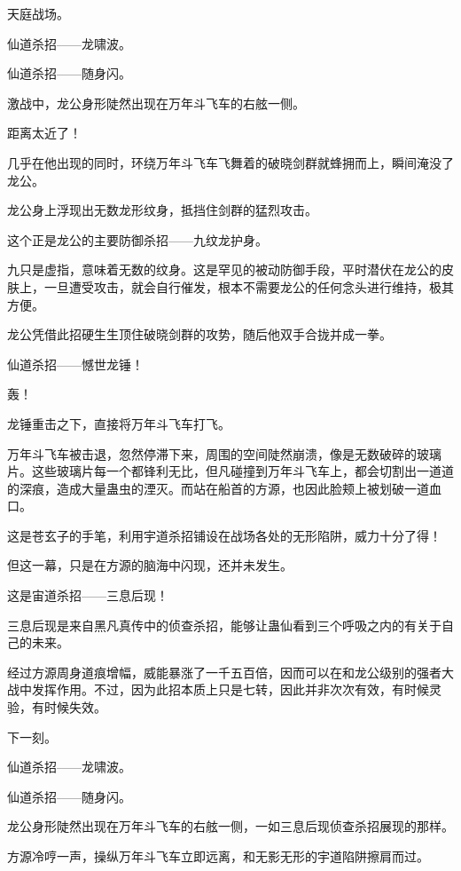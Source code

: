 
\begin{this_body}

天庭战场。

仙道杀招——龙啸波。

仙道杀招——随身闪。

激战中，龙公身形陡然出现在万年斗飞车的右舷一侧。

距离太近了！

几乎在他出现的同时，环绕万年斗飞车飞舞着的破晓剑群就蜂拥而上，瞬间淹没了龙公。

龙公身上浮现出无数龙形纹身，抵挡住剑群的猛烈攻击。

这个正是龙公的主要防御杀招——九纹龙护身。

九只是虚指，意味着无数的纹身。这是罕见的被动防御手段，平时潜伏在龙公的皮肤上，一旦遭受攻击，就会自行催发，根本不需要龙公的任何念头进行维持，极其方便。

龙公凭借此招硬生生顶住破晓剑群的攻势，随后他双手合拢并成一拳。

仙道杀招——憾世龙锤！

轰！

龙锤重击之下，直接将万年斗飞车打飞。

万年斗飞车被击退，忽然停滞下来，周围的空间陡然崩溃，像是无数破碎的玻璃片。这些玻璃片每一个都锋利无比，但凡碰撞到万年斗飞车上，都会切割出一道道的深痕，造成大量蛊虫的湮灭。而站在船首的方源，也因此脸颊上被划破一道血口。

这是苍玄子的手笔，利用宇道杀招铺设在战场各处的无形陷阱，威力十分了得！

但这一幕，只是在方源的脑海中闪现，还并未发生。

这是宙道杀招——三息后现！

三息后现是来自黑凡真传中的侦查杀招，能够让蛊仙看到三个呼吸之内的有关于自己的未来。

经过方源周身道痕增幅，威能暴涨了一千五百倍，因而可以在和龙公级别的强者大战中发挥作用。不过，因为此招本质上只是七转，因此并非次次有效，有时候灵验，有时候失效。

下一刻。

仙道杀招——龙啸波。

仙道杀招——随身闪。

龙公身形陡然出现在万年斗飞车的右舷一侧，一如三息后现侦查杀招展现的那样。

方源冷哼一声，操纵万年斗飞车立即远离，和无影无形的宇道陷阱擦肩而过。


\end{this_body}
